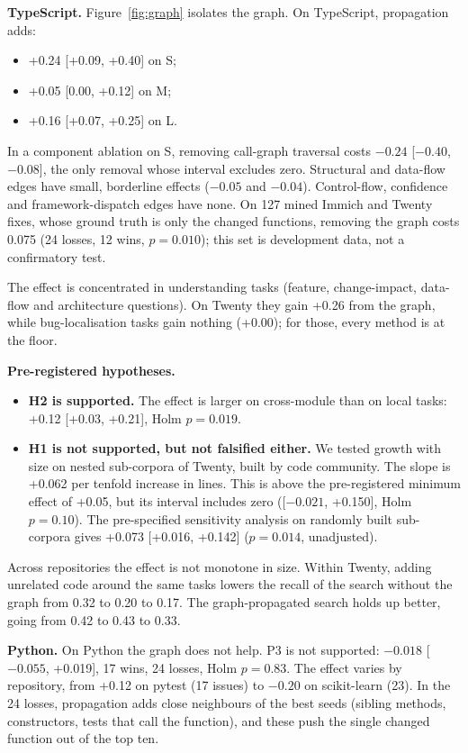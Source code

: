 \documentclass[sigconf,nonacm]{acmart}
\begin{document}
\textbf{TypeScript.} Figure~\ref{fig:graph} isolates the graph. On TypeScript, propagation adds:
\begin{itemize}
\item +0.24 [+0.09, +0.40] on S;
\item +0.05 [0.00, +0.12] on M;
\item +0.16 [+0.07, +0.25] on L.
\end{itemize}
In a component ablation on S, removing call-graph traversal costs $-0.24$ [$-0.40$, $-0.08$], the only removal whose interval excludes zero. Structural and data-flow edges have small, borderline effects ($-0.05$ and $-0.04$). Control-flow, confidence and framework-dispatch edges have none. On 127 mined Immich and Twenty fixes, whose ground truth is only the changed functions, removing the graph costs 0.075 (24 losses, 12 wins, $p = 0.010$); this set is development data, not a confirmatory test.

The effect is concentrated in understanding tasks (feature, change-impact, data-flow and architecture questions). On Twenty they gain +0.26 from the graph, while bug-localisation tasks gain nothing (+0.00); for those, every method is at the floor.

\textbf{Pre-registered hypotheses.}
\begin{itemize}
\item \textbf{H2 is supported.} The effect is larger on cross-module than on local tasks: +0.12 [+0.03, +0.21], Holm $p = 0.019$.
\item \textbf{H1 is not supported, but not falsified either.} We tested growth with size on nested sub-corpora of Twenty, built by code community. The slope is +0.062 per tenfold increase in lines. This is above the pre-registered minimum effect of +0.05, but its interval includes zero ([$-0.021$, +0.150], Holm $p = 0.10$). The pre-specified sensitivity analysis on randomly built sub-corpora gives +0.073 [+0.016, +0.142] ($p = 0.014$, unadjusted).
\end{itemize}
Across repositories the effect is not monotone in size. Within Twenty, adding unrelated code around the same tasks lowers the recall of the search without the graph from 0.32 to 0.20 to 0.17. The graph-propagated search holds up better, going from 0.42 to 0.43 to 0.33.

\textbf{Python.} On Python the graph does not help. P3 is not supported: $-0.018$ [$-0.055$, +0.019], 17 wins, 24 losses, Holm $p = 0.83$. The effect varies by repository, from +0.12 on pytest (17 issues) to $-0.20$ on scikit-learn (23). In the 24 losses, propagation adds close neighbours of the best seeds (sibling methods, constructors, tests that call the function), and these push the single changed function out of the top ten.
\end{document}
